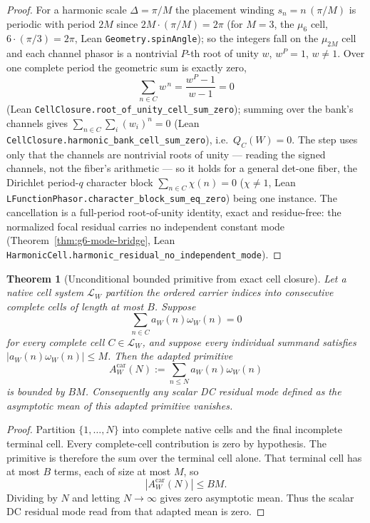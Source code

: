 \documentclass[11pt]{article}
\newtheorem{theorem}{Theorem}
\theoremstyle{definition}
\begin{document}
\begin{proof}
For a harmonic scale \(\Delta=\pi/M\) the placement winding \(s_n=n\,(\pi/M)\)
is periodic with period \(2M\) since \(2M\cdot(\pi/M)=2\pi\) (for \(M=3\), the
\(\mu_6\) cell, \(6\cdot(\pi/3)=2\pi\), Lean \texttt{Geometry.spinAngle}); so the
integers fall on the \(\mu_{2M}\) cell and each channel phasor is a nontrivial
\(P\)-th root of unity \(w\), \(w^P=1\), \(w\neq1\).  Over one complete period
the geometric sum is exactly zero,
\[
\sum_{n\in C}w^{\,n}=\frac{w^P-1}{w-1}=0
\]
(Lean \texttt{CellClosure.root\_of\_unity\_cell\_sum\_zero}); summing over the
bank's channels gives \(\sum_{n\in C}\sum_i (w_i)^{n}=0\) (Lean
\texttt{CellClosure.harmonic\_bank\_cell\_sum\_zero}), i.e.\ \(Q_C(W)=0\).  The
step uses only that the channels are nontrivial roots of unity --- reading the
signed channels, not the fiber's arithmetic --- so it holds for a general
det-one fiber, the Dirichlet period-\(q\) character block
\(\sum_{n\in C}\chi(n)=0\) (\(\chi\neq1\), Lean
\texttt{LFunctionPhasor.character\_block\_sum\_eq\_zero}) being one instance.
The cancellation is a full-period root-of-unity identity, exact and
residue-free: the normalized focal residual carries no independent constant
mode (Theorem~\ref{thm:g6-mode-bridge}, Lean
\texttt{HarmonicCell.harmonic\_residual\_no\_independent\_mode}).
\end{proof}

\begin{theorem}[Unconditional bounded primitive from exact cell closure]\label{thm:g5-bounded-primitive-from-cells}
Let a native cell system \(\mathcal L_W\) partition the ordered carrier
indices into consecutive complete cells of length at most \(B\).  Suppose
\[
\sum_{n\in C}a_W(n)\omega_W(n)=0
\]
for every complete cell \(C\in\mathcal L_W\), and suppose every individual
summand satisfies \(|a_W(n)\omega_W(n)|\le M\).  Then the adapted primitive
\[
A_W^{\mathrm{car}}(N):=\sum_{n\le N}a_W(n)\omega_W(n)
\]
is bounded by \(BM\).  Consequently any scalar DC residual mode defined as the
asymptotic mean of this adapted primitive vanishes.
\end{theorem}

\begin{proof}
Partition \(\{1,\ldots,N\}\) into complete native cells and the final
incomplete terminal cell.  Every complete-cell contribution is zero by
hypothesis.  The primitive is therefore the sum over the terminal cell alone.
That terminal cell has at most \(B\) terms, each of size at most \(M\), so
\[
|A_W^{\mathrm{car}}(N)|\le BM.
\]
Dividing by \(N\) and letting \(N\to\infty\) gives zero asymptotic mean.  Thus
the scalar DC residual mode read from that adapted mean is zero.
\end{proof}
\end{document}
